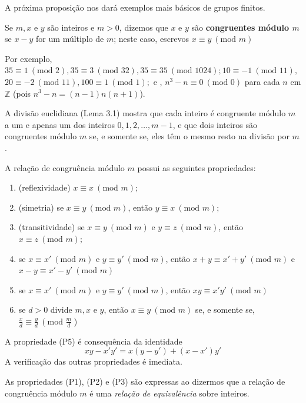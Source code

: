 A próxima proposição nos dará exemplos mais básicos de grupos finitos.

\begin{definicao}
Se $m,x$ e $y$ são inteiros e $m > 0$, dizemos que $x$ e $y$ são \textbf{congruentes módulo $m$} se $x - y$ for um 
múltiplo de $m$; neste caso, escrevos $x \equiv y\ (\text{mod } m)$
\end{definicao}

Por exemplo, $35 \equiv 1 \ (\text{mod } 2), 35 \equiv 3 \ (\text{mod } 32), 35 \equiv 35 \ (\text{mod } 1024); 10 \equiv -1 \ (\text{mod } 11),$
$20 \equiv -2 \ (\text{mod } 11), 100 \equiv 1 \ (\text{mod } 1);$ e ,
$n^3 - n \equiv 0 \ (\text{mod } 0)$ para cada $n$ em $\mathbb{Z}$ (pois $n^3 - n = (n - 1) n (n + 1)$).

A divisão euclidiana (Lema 3.1) mostra que cada inteiro é congruente módulo $m$ a um e apenas um dos inteiros $0,1,2, \ldots ,m -1$,
e que dois inteiros são congruentes módulo $m$ se, e somente se, eles têm o mesmo resto na divisão por $m$.

A relação de congruência módulo $m$ possui as seguintes propriedades:

\begin{enumerate}[label=(P\arabic*), left=0.5cm, align=left, nosep]
    \item (reflexividade) $x \equiv x \ (\text{mod } m);$
    \item (simetria) se $x \equiv y \ (\text{mod } m)$, então $y \equiv x \ (\text{mod } m);$
    \item (transitividade) se $x \equiv y \ (\text{mod } m)$ e $y \equiv z \ (\text{mod } m)$, então
    $x \equiv z \ (\text{mod } m);$
    \item se $x \equiv x' \ (\text{mod } m)$ e $y \equiv y' \ (\text{mod } m)$, então
    $x + y\equiv x' + y' \ (\text{mod } m)$ e $x - y \equiv x' - y' \ (\text{mod } m)$
    \item se $x \equiv x' \ (\text{mod } m)$ e $y \equiv y' \ (\text{mod } m)$, então 
    $xy \equiv x'y' \ (\text{mod } m)$
    \item se $d > 0$ divide $m, x$ e $y$, então $x \equiv y \ (\text{mod } m)$ se, e somente se,
    $\frac{x}{d} \equiv \frac{y}{d} \ (\text{mod } \frac{m}{d})$  
\end{enumerate} 

A propriedade (P5) é consequência da identidade
\[
    xy - x'y' = x(y - y') + (x - x')y'
\]
A verificação das outras propriedades é imediata.

As propriedades (P1), (P2) e (P3) são expressas ao dizermos que a relação de congruência módulo $m$ é uma 
\emph{relação de equivalência} sobre inteiros.

